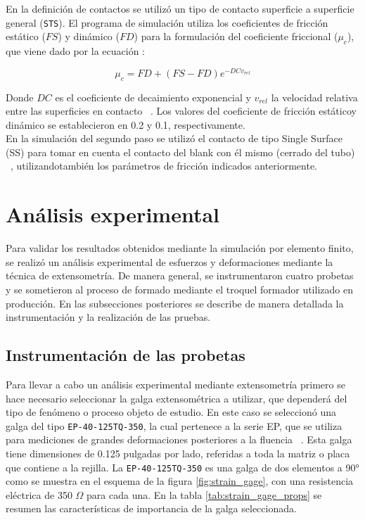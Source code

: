 En la definición de contactos se utilizó un tipo de contacto superficie a superficie
general (\texttt{STS}). El programa de simulación utiliza los coeficientes de fricción 
estático ($FS$) y dinámico ($FD$) para la formulación del coeficiente friccional ($\mu_c$),
que viene dado por la ecuación :

\begin{equation}
\mu_c = FD + (FS - FD) e^{-DCv_{rel}}
\label{eq:frictional_coeff}
\end{equation}

Donde $DC$ es el coeficiente de decaimiento exponencial y $v_{rel}$ la velocidad relativa
entre las superficies en contacto ~\cite{lsdyna-manual}. Los valores del coeficiente de 
fricción estáticoy dinámico se establecieron en 0.2 y 0.1, respectivamente. ~\cite{carvill1993} \\

En la simulación del segundo paso se utilizó el contacto de tipo Single Surface (SS) para 
tomar en cuenta el contacto del blank con él mismo (cerrado del tubo) ~\cite{lsdyna-manual}, 
utilizandotambién los parámetros de fricción indicados anteriormente.

\section{Análisis experimental}

Para validar los resultados obtenidos mediante la simulación por elemento finito, se realizó 
un análisis experimental de esfuerzos y deformaciones mediante la técnica de extensometría. 
De manera general, se instrumentaron cuatro probetas y se sometieron al proceso de formado 
mediante el troquel formador utilizado en producción. En las subsecciones posteriores se describe 
de manera detallada la instrumentación y la realización de las pruebas.

\subsection{Instrumentación de las probetas}

Para llevar a cabo un análisis experimental mediante extensometría primero se hace necesario 
seleccionar la galga extensométrica a utilizar, que dependerá del tipo de fenómeno o proceso 
objeto de estudio. En este caso se seleccionó una galga del tipo \texttt{EP-40-125TQ-350}, la 
cual pertenece a la serie EP, que se utiliza para mediciones de grandes deformaciones posteriores 
a la fluencia ~\cite{vishay-catalog}. Esta galga tiene dimensiones de 0.125 pulgadas por lado, referidas a toda la 
matriz o placa que contiene a la rejilla. La \texttt{EP-40-125TQ-350} es una galga de dos 
elementos a 90° como se muestra en el esquema de la figura \ref{fig:strain_gage}, con 
una resistencia eléctrica de 350 $\Omega$ para cada una. En la tabla \ref{tab:strain_gage_props} 
se resumen las características de importancia de la galga seleccionada.

